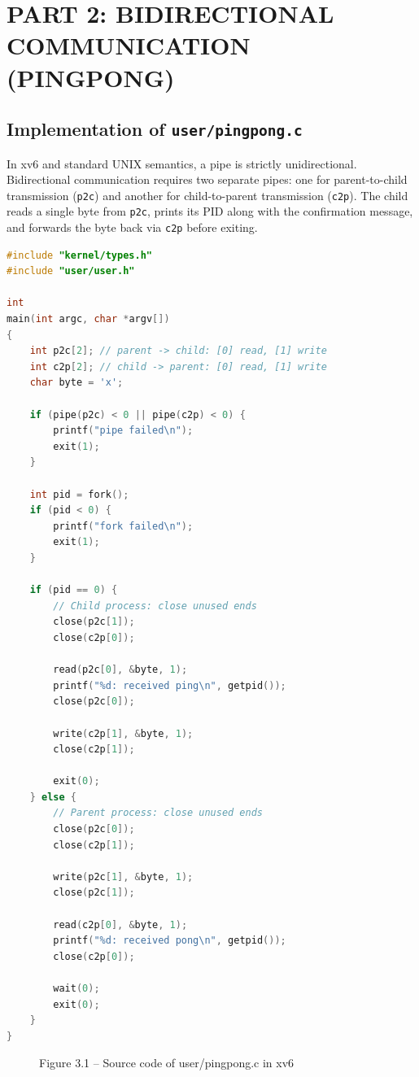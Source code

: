 \documentclass[12pt,a4paper]{report}
\numberwithin{equation}{chapter}
\numberwithin{figure}{chapter}
\numberwithin{table}{chapter}
\begin{document}
\chapter{PART 2: BIDIRECTIONAL COMMUNICATION (PINGPONG)}

\section{Implementation of \texttt{user/pingpong.c}}
In xv6 and standard UNIX semantics, a pipe is strictly unidirectional. Bidirectional communication requires two separate pipes: one for parent-to-child transmission (\texttt{p2c}) and another for child-to-parent transmission (\texttt{c2p}). The child reads a single byte from \texttt{p2c}, prints its PID along with the confirmation message, and forwards the byte back via \texttt{c2p} before exiting.

\begin{lstlisting}[language=C, caption={Source code of \texttt{user/pingpong.c}}]
#include "kernel/types.h"
#include "user/user.h"

int
main(int argc, char *argv[])
{
    int p2c[2]; // parent -> child: [0] read, [1] write
    int c2p[2]; // child -> parent: [0] read, [1] write
    char byte = 'x';

    if (pipe(p2c) < 0 || pipe(c2p) < 0) {
        printf("pipe failed\n");
        exit(1);
    }

    int pid = fork();
    if (pid < 0) {
        printf("fork failed\n");
        exit(1);
    }

    if (pid == 0) {
        // Child process: close unused ends
        close(p2c[1]);
        close(c2p[0]);

        read(p2c[0], &byte, 1);
        printf("%d: received ping\n", getpid());
        close(p2c[0]);

        write(c2p[1], &byte, 1);
        close(c2p[1]);

        exit(0);
    } else {
        // Parent process: close unused ends
        close(p2c[0]);
        close(c2p[1]);

        write(p2c[1], &byte, 1);
        close(p2c[1]);

        read(c2p[0], &byte, 1);
        printf("%d: received pong\n", getpid());
        close(c2p[0]);

        wait(0);
        exit(0);
    }
}
\end{lstlisting}

\begin{figure}[H]
\centering
\caption{Figure 3.1 -- Source code of user/pingpong.c in xv6}
\end{figure}
\end{document}
